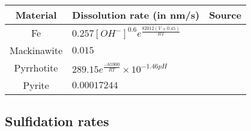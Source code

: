 \documentclass{article}
\begin{document}
\begin{center}
    \begin{tabular}{ | c | p{8cm} | c |}
    \hline
    Material & Dissolution rate (in nm/s) & Source \\

    \hline
    Fe & $0.257 [OH^-]^{0.6} e^{\frac{82012(V+0.45)}{R T}}$ & \cite{EKASRC72} \\

    \hline
    Mackinawite & $0.015$ & \cite{CMESLS08} \\

    \hline
    Pyrrhotite & $289.15 e^{\frac{-65900}{R T}} \times 10^{-1.46 pH}$ & \cite{PDAMPC14} \\

    \hline
    Pyrite & $0.00017244$ & \cite{ISACMP08} \\

    \hline

    \end{tabular}
\end{center}






\subsection{Sulfidation rates}
\end{document}
